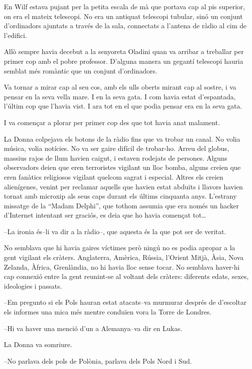 En Wilf estava pujant per la petita escala de mà que portava cap al pis
superior, on era el mateix telescopi. No era un antiquat telescopi
tubular, sinó un conjunt d'ordinadors ajuntats a través de la sala,
connectats a l'antena de ràdio al cim de l'edifici.

Allò sempre havia decebut a la senyoreta Oladini quan va arribar a
treballar per primer cop amb el pobre professor. D'alguna manera un
gegantí telescopi hauria semblat més romàntic que un conjunt
d'ordinadors.

Va tornar a mirar cap al seu cos, amb els ulls oberts mirant cap al
sostre, i va pensar en la seva vella mare. I en la seva gata. I com
havia estat d'espantada, l'últim cop que l'havia vist. I ara tot en el
que podia pensar era en la seva gata.

I va començar a plorar per primer cop des que tot havia anat malament.

La Donna colpejava els botons de la ràdio fins que va trobar un canal.
No volia música, volia notícies. No va ser gaire difícil de trobar-ho.
Arreu del globus, massius rajos de llum havien caigut, i estaven
rodejats de persones. Alguns observadors deien que eren terroristes
vigilant un lloc bomba, alguns creien que eren fanàtics religiosos
vigilant quelcom sagrat i especial. Altres els creien alienígenes,
venint per reclamar aquells que havien estat abduïts i llavors havien
tornat amb microxip als seus caps durant els últims cinquanta anys.
L'estrany missatge de la ``Madam Delphi'', que tothom assumia que era
només un hacker d'Internet intentant ser graciós, es deia que ho havia
començat tot\ldots{}

--La ironia és--li va dir a la ràdio--, que aquesta és la que pot ser de
veritat.

No semblava que hi havia gaires víctimes però ningú no es podia apropar
a la gent vigilant els cràters. Anglaterra, Amèrica, Rússia, l'Orient
Mitjà, Àsia, Nova Zelanda, Àfrica, Grenlàndia, no hi havia lloc sense
tocar. No semblava haver-hi cap connexió entre la gent reunint-se al
voltant dels cràters: diferents edats, sexes, ideologies i passats.

--Em pregunto si els Pols hauran estat atacats--va murmurar després de
d'escoltar els informes una mica més mentre conduïen vora la Torre de
Londres.

--Hi va haver una menció d'un a Alemanya--va dir en Lukas.

La Donna va somriure.

--No parlava dels pols de Polònia, parlava dels Pols Nord i Sud.

